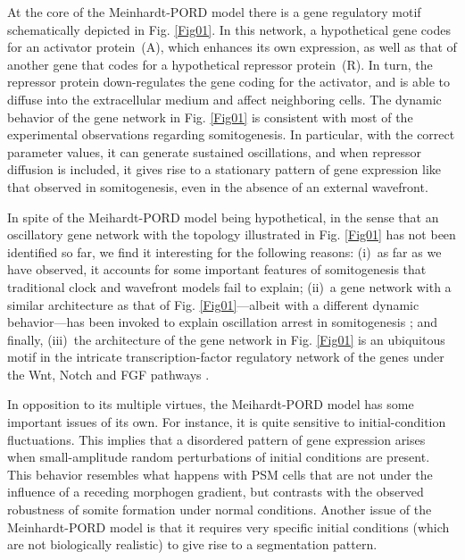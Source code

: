 \documentclass[%
 preprint,
 aip, 
 amsmath,amssymb,
]{revtex4-2}
\begin{document}
At the core of the Meinhardt-PORD model there is a gene regulatory motif schematically depicted in Fig. \ref{Fig01}. In this network, a hypothetical gene codes for an activator protein~(A), which enhances its own expression, as well as that of another gene that codes for a hypothetical repressor protein~(R). In turn, the repressor protein down-regulates the gene coding for the activator, and is able to diffuse into the extracellular medium and affect neighboring cells. The dynamic behavior of the gene network in Fig. \ref{Fig01} is consistent with most of the experimental observations regarding somitogenesis. In particular, with the correct parameter values, it can generate sustained oscillations, and when repressor diffusion is included, it gives rise to a stationary pattern of gene expression like that observed in somitogenesis, even in the absence of an external wavefront.
	
In spite of the Meihardt-PORD model being hypothetical, in the sense that an oscillatory gene network with the topology illustrated in Fig. \ref{Fig01} has not been identified so far, we find it interesting for the following reasons: (i)~as far as we have observed, it accounts for some important features of somitogenesis that traditional clock and wavefront models fail to explain; (ii)~a gene network with a similar architecture as that of Fig. \ref{Fig01}---albeit with a different dynamic behavior---has been invoked to explain oscillation arrest in somitogenesis \cite{Santillan2008, Zavala2012}; and finally, (iii)~the architecture of the gene network in Fig. \ref{Fig01} is an ubiquitous motif in the intricate transcription-factor regulatory network of the genes under the Wnt, Notch and FGF pathways \cite{Gibb2010, Zavala2012}.
	
In opposition to its multiple virtues, the Meihardt-PORD model has some important issues of its own. For instance, it is quite sensitive to initial-condition fluctuations. This implies that a disordered pattern of gene expression arises when small-amplitude random perturbations of initial conditions are present. This behavior resembles what happens with PSM cells that are not under the influence of a receding morphogen gradient, but contrasts with the observed robustness of somite formation under normal conditions. Another issue of the Meinhardt-PORD model is that it requires very specific initial conditions (which are not biologically realistic) to give rise to a segmentation pattern. 
\end{document}
